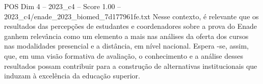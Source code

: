 \begin{textsample}{POS Dim 4 – 2023\_c4 – Score 1.00 – 2023\_c4/enade\_2023\_biomed\_7d177961fe.txt}
Nesse contexto, é relevante que os resultados das percepções de estudantes e coordenadores sobre a prova do Enade ganhem relevância como um elemento a mais nas análises da oferta dos cursos nas modalidades presencial e a distância, em nível nacional.
Espera -se, assim, que, em uma visão formativa de avaliação, o conhecimento e a análise desses resultados possam contribuir para a construção de alternativas institucionais que induzam à excelência da educação superior.

\end{textsample}
